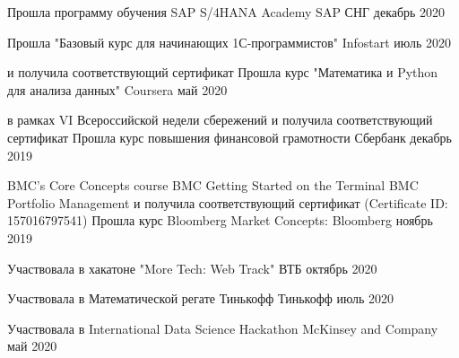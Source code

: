 \documentclass[]{awesome-cv}
\begin{document}
\begin{cventries}
	\cventry
		{}
	{Прошла программу обучения SAP S/4HANA Academy}
	{SAP СНГ}
	{декабрь 2020}
	{}
	\end{cventries} \vspace{-5mm}\begin{cventries}
	\cventry
		{}
	{Прошла "Базовый курс для начинающих 1С-программистов" }
	{Infostart}
	{июль 2020}
	{}
	\end{cventries} \vspace{-5mm}\begin{cventries}
	\cventry
	{и получила соответствующий сертификат}
	{Прошла курс "Математика и Python для анализа данных" }
	{Coursera}
	{май 2020}
	{}
	\end{cventries} \vspace{-5mm} \begin{cventries}
	\cventry
{в рамках VI Всероссийской недели сбережений и получила соответствующий сертификат}
	{Прошла курс повышения финансовой грамотности}
	{Сбербанк}
	{декабрь 2019}
	{}
	\end{cventries}\vspace{-5mm}  \begin{cventries}
	
	\cventry
		{\quad \bullet BMC's Core Concepts course
	\newline \quad \bullet BMC Getting Started on the Terminal
	\newline \quad \bullet BMC Portfolio Management
	\newline \quad и получила соответствующий сертификат (Certificate ID: 157016797541)}
	{Прошла курс Bloomberg Market Concepts:}
	{Bloomberg}
	{ноябрь 2019}
	{}
	\end{cventries} 
	\vspace{-7mm}


	\begin{cventries}
	\cventry
	{}
	{Участвовала в хакатоне "More Tech: Web Track"}
	{ВТБ}
	{октябрь 2020}
	{}
	\end{cventries}  \vspace{-5mm} 
	 \begin{cventries}
	\cventry	
	{}
	{Участвовала в Математической регате Тинькофф}
	{Тинькофф}
	{июль 2020}
	{}
		\end{cventries}  \vspace{-5mm} \begin{cventries}
	\cventry	
	{}
	{Участвовала в International Data Science Hackathon}
	{McKinsey and Company}
	{май 2020}
	{}
		\end{cventries}  \vspace{-7mm}
\end{document}
